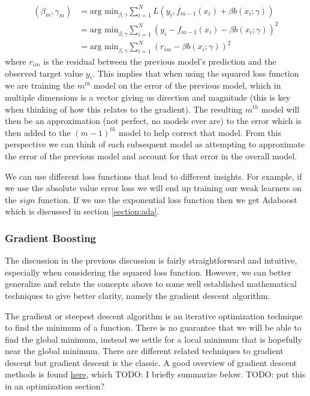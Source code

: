 \begin{equation}
\begin{split}
(\beta_m, \gamma_m)  & = \text{arg min}_{\beta, \gamma} \sum_{i=1}^{N}{L(y_i, f_{m-1}(x_i) + \beta b(x_i;\gamma))}\\
&= \text{arg min}_{\beta, \gamma} \sum_{i=1}^{N}{(y_i - f_{m-1}(x_i) - \beta b(x_i;\gamma))^2}\\
&= \text{arg min}_{\beta, \gamma} \sum_{i=1}^{N}{(r_{im} - \beta b(x_i;\gamma))^2}
\end{split}
\end{equation}
where $r_{im}$ is the residual between the previous model's prediction and the observed target value $y_i$. This implies that when using the squared loss function we are training the $m^{th}$ model on the error of the previous model, which in multiple dimensions is a vector giving us direction and magnitude (this is key when thinking of how this relates to the gradient). The resulting $m^{th}$ model will then be an approximation (not perfect, no models ever are) to the error which is then added to the $(m-1)^{th}$ model to help correct that model. From this perspective we can think of each subsequent model as attempting to approximate the error of the previous model and account for that error in the overall model.

We can use different loss functions that lead to different insights. For example, if we use the absolute value error loss we will end up training our weak learners on the $sign$ function. If we use the exponential loss function then we get Adaboost which is discussed in section \ref{section:ada}.

\subsubsection{Gradient Boosting}

The discussion in the previous discussion is fairly straightforward and intuitive, especially when considering the squared loss function. However, we can better generalize and relate the concepts above to some well established mathematical techniques to give better clarity, namely the gradient descent algorithm. 

The gradient or steepest descent algorithm is an iterative optimization technique to find the minimum of a function. There is no guarantee that we will be able to find the global minimum, instead we settle for a local minimum that is hopefully near the global minimum. There are different related techniques to gradient descent but gradient descent is the classic. A good overview of gradient descent methods is found \href{http://www.acme.byu.edu/wp-content/uploads/2018/02/GradientMethods.pdf}{here}, which TODO: I briefly summarize below. TODO: put this in an optimization section?


